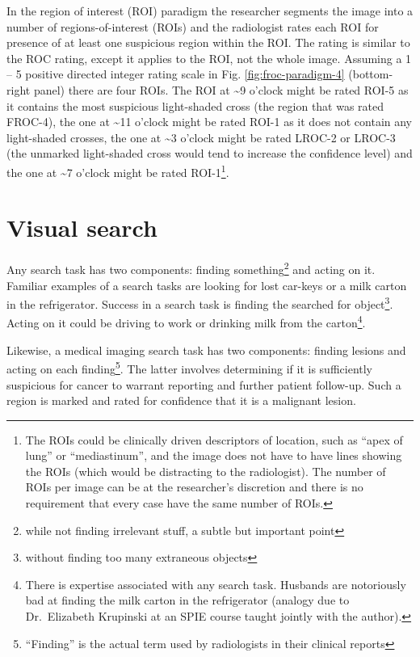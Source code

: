 \documentclass[
]{book}
\begin{document}
\begin{itemize}
  In the region of interest (ROI) paradigm the researcher segments the image into a number of regions-of-interest (ROIs) and the radiologist rates each ROI for presence of at least one suspicious region within the ROI. The rating is similar to the ROC rating, except it applies to the ROI, not the whole image. Assuming a 1 -- 5 positive directed integer rating scale in Fig. \ref{fig:froc-paradigm-4} (bottom-right panel) there are four ROIs. The ROI at \textasciitilde9 o'clock might be rated ROI-5 as it contains the most suspicious light-shaded cross (the region that was rated FROC-4), the one at \textasciitilde11 o'clock might be rated ROI-1 as it does not contain any light-shaded crosses, the one at \textasciitilde3 o'clock might be rated LROC-2 or LROC-3 (the unmarked light-shaded cross would tend to increase the confidence level) and the one at \textasciitilde7 o'clock might be rated ROI-1\footnote{The ROIs could be clinically driven descriptors of location, such as ``apex of lung'' or ``mediastinum'', and the image does not have to have lines showing the ROIs (which would be distracting to the radiologist). The number of ROIs per image can be at the researcher's discretion and there is no requirement that every case have the same number of ROIs.}.
\end{itemize}

\hypertarget{froc-paradigm-vis-search}{%
\section{Visual search}\label{froc-paradigm-vis-search}}

Any search task has two components: finding something\footnote{while not finding irrelevant stuff, a subtle but important point} and acting on it. Familiar examples of a search tasks are looking for lost car-keys or a milk carton in the refrigerator. Success in a search task is finding the searched for object\footnote{without finding too many extraneous objects}. Acting on it could be driving to work or drinking milk from the carton\footnote{There is expertise associated with any search task. Husbands are notoriously bad at finding the milk carton in the refrigerator (analogy due to Dr.~Elizabeth Krupinski at an SPIE course taught jointly with the author).}.

Likewise, a medical imaging search task has two components: finding lesions and acting on each finding\footnote{``Finding'' is the actual term used by radiologists in their clinical reports}. The latter involves determining if it is sufficiently suspicious for cancer to warrant reporting and further patient follow-up. Such a region is marked and rated for confidence that it is a malignant lesion.
\end{document}
